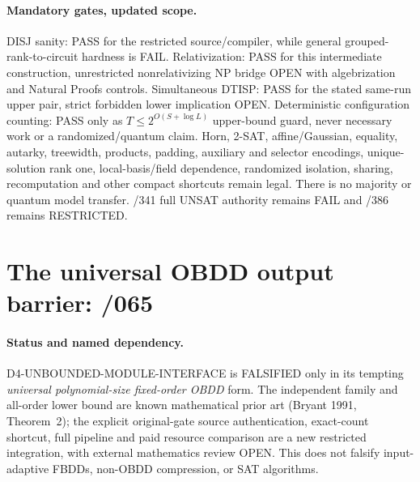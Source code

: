\documentclass[11pt]{article}
\begin{document}
\paragraph{Mandatory gates, updated scope.}
DISJ sanity: PASS for the restricted source/compiler, while general grouped-rank-to-circuit hardness is FAIL. Relativization: PASS for this intermediate construction, unrestricted nonrelativizing NP bridge OPEN with algebrization and Natural Proofs controls. Simultaneous DTISP: PASS for the stated same-run upper pair, strict forbidden lower implication OPEN. Deterministic configuration counting: PASS only as $T\le2^{O(S+\log L)}$ upper-bound guard, never necessary work or a randomized/quantum claim. Horn, 2-SAT, affine/Gaussian, equality, autarky, treewidth, products, padding, auxiliary and selector encodings, unique-solution rank one, local-basis/field dependence, randomized isolation, sharing, recomputation and other compact shortcuts remain legal. There is no majority or quantum model transfer. /341 full UNSAT authority remains FAIL and /386 remains RESTRICTED.

\section{The universal OBDD output barrier: /065}

\paragraph{Status and named dependency.}
D4-UNBOUNDED-MODULE-INTERFACE is FALSIFIED only in its tempting
\emph{universal polynomial-size fixed-order OBDD} form.
The independent family and all-order lower bound are known mathematical prior
art (Bryant 1991, Theorem~2); the explicit original-gate
source authentication, exact-count shortcut, full pipeline and paid
resource comparison are a new restricted integration, with external
mathematics review OPEN. This does not falsify input-adaptive FBDDs,
non-OBDD compression, or SAT algorithms.
\end{document}
